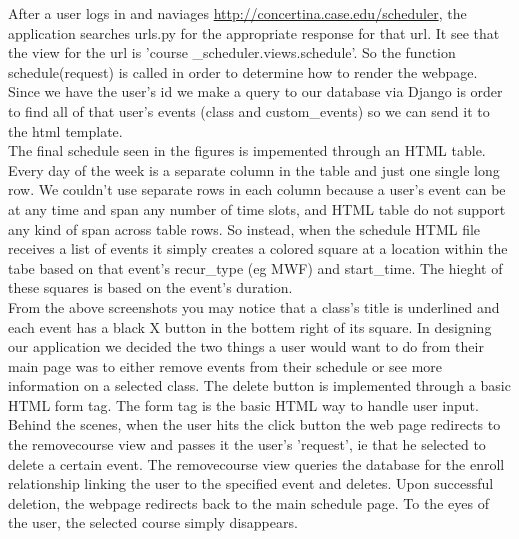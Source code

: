 \documentclass[pdftex,12pt,letter]{article}
\begin{document}
\FloatBarrier
\newpage
After a user logs in and naviages \url{http://concertina.case.edu/scheduler}, the application searches urls.py for the appropriate response for that url. It see that the view for the url is 'course \_scheduler.views.schedule'. So the function schedule(request) is called in order to determine how to render the webpage. Since we have the user's id we make a query to our database via Django is order to find all of that user's events (class and custom\_events) so we can send it to the html template.\\

The final schedule seen in the figures is impemented through an HTML table. Every day of the week is a separate column in the table and just one single long row. We couldn't use separate rows in each column because a user's event can be at any time and span any number of time slots, and HTML table do not support any kind of span across table rows. So instead, when the schedule HTML file receives a list of events it simply creates a colored square at a location within the tabe based on that event's recur\_type (eg MWF) and start\_time. The hieght of these squares is based on the event's duration. \\

From the above screenshots you may notice that a class's title is underlined and each event has a black X button in the bottem right of its square. In designing our application we decided the two things a user would want to do from their main page was to either remove events from their schedule or see more information on a selected class. The delete button is implemented through a basic HTML form tag. The form tag is the basic HTML way to handle user input. Behind the scenes, when the user hits the click button the web page redirects to the removecourse view and passes it the user's 'request', ie that he selected to delete a certain event. The removecourse view queries the database for the enroll relationship linking the user to the specified event and deletes. Upon successful deletion, the webpage redirects back to the main schedule page. To the eyes of the user, the selected course simply disappears.\\
\end{document}
